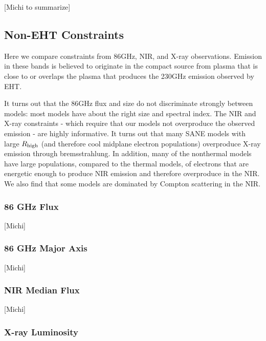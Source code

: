 [Michi to summarize]

\subsection{Non-EHT Constraints}

Here we compare constraints from 86GHz, NIR, and X-ray observations.  Emission in these bands is believed to originate in the compact source from plasma that is close to or overlaps the plasma that produces the 230GHz emission observed by EHT.

It turns out that the 86GHz flux and size do not discriminate strongly between models: most models have about the right size and spectral index.  The NIR and X-ray constraints - which require that our models not overproduce the observed emission - are highly informative.  It turns out that many SANE models with large ${R_\mathrm{high}}$ (and therefore cool midplane electron populations) overproduce X-ray emission through bremsstrahlung.  In addition, many of the nonthermal models have large populations, compared to the thermal models, of electrons that are energetic enough to produce NIR emission and therefore overproduce in the NIR.   We also find that some models are dominated by Compton scattering in the NIR.

\subsubsection{86 GHz Flux}

[Michi]

\subsubsection{86 GHz Major Axis}

[Michi]

\subsubsection{NIR Median Flux}

[Michi]

\subsubsection{X-ray Luminosity}

